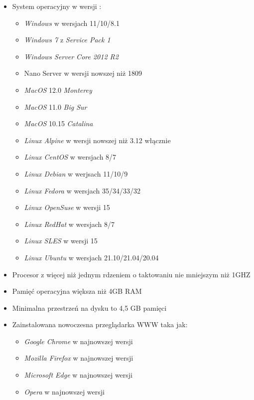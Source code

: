 \documentclass[a4paper,twoside,12pt]{book}
\begin{document}
	\begin{itemize}
		\item System operacyjny w wersji \cite{bib:requirementsWin}\cite{bib:requirementsMac}\cite{bib:requirementsLinux}\cite{bib:requirementsMongo}\cite{bib:requirementsFramework}:
		\begin {itemize}
			\item \textit{Windows} w wersjach 11/10/8.1
			\item \textit{Windows 7} z \textit{Service Pack 1}
			\item \textit{Windows Server Core 2012 R2}
			\item Nano Server w wersji nowszej niż 1809
			\item \textit{MacOS} 12.0 \textit{Monterey}
			\item \textit{MacOS} 11.0 \textit{Big Sur}
			\item \textit{MacOS} 10.15 \textit{Catalina}
			\item \textit{Linux Alpine} w wersji nowszej niż 3.12 włącznie
			\item \textit{Linux CentOS} w wersjach 8/7
			\item \textit{Linux Debian} w werjsach 11/10/9
			\item \textit{Linux Fedora} w wersjach 35/34/33/32
			\item \textit{Linux OpenSuse} w wersji 15
			\item \textit{Linux RedHat} w wersjach 8/7
			\item \textit{Linux SLES} w wersji 15
			\item \textit{Linux Ubuntu} w wersjach 21.10/21.04/20.04
		\end {itemize}	
		\item Procesor z więcej niż jednym rdzeniem o taktowaniu nie mniejszym niż 1GHZ
		\item Pamięć operacyjna większa niż 4GB RAM
		\item Minimalna przestrzeń na dysku to 4,5 GB pamięci
		\item Zainstalowana nowoczesna przeglądarka WWW taka jak:
		\begin{itemize}
			\item \textit{Google Chrome} w najnowszej wersji
			\item \textit{Mozilla Firefox} w najnowszej wersji
			\item \textit{Microsoft Edge} w najnowszej wersji
			\item \textit{Opera} w najnowszej wersji
		\end{itemize}
	\end{itemize}
\end{document}
